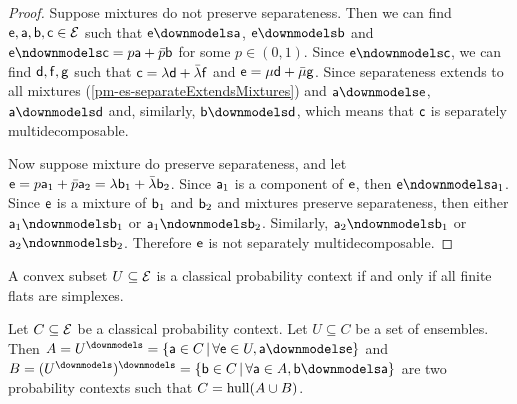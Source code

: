 	\begin{proof}
		Suppose mixtures do not preserve separateness. Then we can find $\ens,\ens[a],\ens[b], \ens[c] \in \Ens$ such that $\ens \separate \ens[a]$, $\ens \separate \ens[b]$ and $\ens \nseparate \ens[c] = p \ens[a] + \bar{p} \ens[b]$ for some $p \in (0,1)$. Since $\ens \nseparate \ens[c]$, we can find $\ens[d], \ens[f], \ens[g]$ such that $\ens[c] = \lambda \ens[d] + \bar{\lambda} \ens[f]$ and $\ens = \mu \ens[d] + \bar{\mu} \ens[g]$.  Since separateness extends to all mixtures (\ref{pm-es-separateExtendsMixtures}) and $\ens[a] \separate \ens[e]$, $\ens[a] \separate \ens[d]$ and, similarly, $\ens[b] \separate \ens[d]$, which means that $\ens[c]$ is separately multidecomposable.
		
		Now suppose mixture do preserve separateness, and let $\ens = p \ens[a]_1 + \bar{p} \ens[a]_2 = \lambda \ens[b]_1 +\bar{\lambda} \ens[b]_2$. Since $\ens[a]_1$ is a component of $\ens$, then $\ens \nseparate \ens[a]_1$. Since $\ens$ is a mixture of $\ens[b]_1$ and $\ens[b]_2$ and mixtures preserve separateness, then either $\ens[a]_1 \nseparate \ens[b]_1$ or $\ens[a]_1 \nseparate \ens[b]_2$. Similarly, $\ens[a]_2 \nseparate \ens[b]_1$ or $\ens[a]_2 \nseparate \ens[b]_2$. Therefore $\ens$ is not separately multidecomposable.
	\end{proof}
	
	\begin{conj}
		A convex subset $U \subseteq \Ens$ is a classical probability context if and only if all finite flats are simplexes.
	\end{conj}
	
	\begin{prop}
		Let $C \subseteq \Ens$ be a classical probability context. Let $U \subseteq C$ be a set of ensembles. Then $A=U^\separate=\{ \ens[a] \in C \, | \, \forall \ens \in U, \ens[a] \separate \ens \}$ and $B=(U^\separate)^\separate=\{ \ens[b] \in C \, | \, \forall \ens[a] \in A, \ens[b] \separate \ens[a] \}$ are two probability contexts such that $C = \hull(A \cup B)$.
	\end{prop}
	
